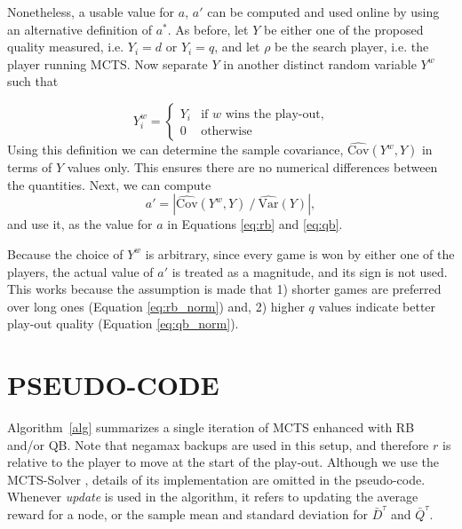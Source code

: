 \documentclass{ecai2014}
\newcommand{\SVar}[1]{\mathrm{\widehat{Var}}\left( #1 \right)}
\newcommand{\SCov}[1]{\mathrm{\widehat{Cov}}\left( #1 \right)}
\begin{document}
Nonetheless, a usable value for $a$, $a'$ can be computed and used online by using an alternative definition of $a^*$. As before, let $Y$ be either one of the proposed quality measured, i.e. $Y_i=d$ or $Y_i=q$, and let $\rho$ be the search player, i.e. the player running MCTS. Now separate $Y$ in another distinct random variable $Y^w$ such that

\begin{equation}
Y^w_i =
\begin{cases}
   Y_i & \text{if $w$ wins the play-out,} \\
   0   & \text{otherwise}
\end{cases}
\label{eq:ywin}
\end{equation}
Using this definition we can determine the sample covariance, $\SCov{Y^w,Y}$ in terms of $Y$ values only. This ensures there are no numerical differences between the quantities. Next, we can compute 
\begin{equation}
	a'=\left|{\SCov{Y^w,Y}}\mathbin{/}{\SVar{Y}}\right|,
\label{eq:onlinea}
\end{equation}
\noindent and use it, as the value for $a$ in Equations \ref{eq:rb} and \ref{eq:qb}. 

Because the choice of $Y^w$ is arbitrary, since every game is won by either one of the players, the actual value of $a'$ is treated as a magnitude, and its sign is not used. This works because the assumption is made that 1) shorter games are preferred over long ones (Equation \ref{eq:rb_norm}) and, 2) higher $q$ values indicate better play-out quality (Equation \ref{eq:qb_norm}).

\section{PSEUDO-CODE}
\label{sec:pseudo-code}

Algorithm~\ref{alg} summarizes a single iteration of MCTS enhanced with RB and/or QB. Note that negamax backups are used in this setup, and therefore $r$ is relative to the player to move at the start of the play-out. Although we use the MCTS-Solver \cite{Winands2008}, details of its implementation are omitted in the pseudo-code. Whenever \emph{update} is used in the algorithm, it refers to updating the average reward for a node, or the sample mean and standard deviation for $\bar{D}^\tau$ and $\bar{Q}^\tau$.
\end{document}
